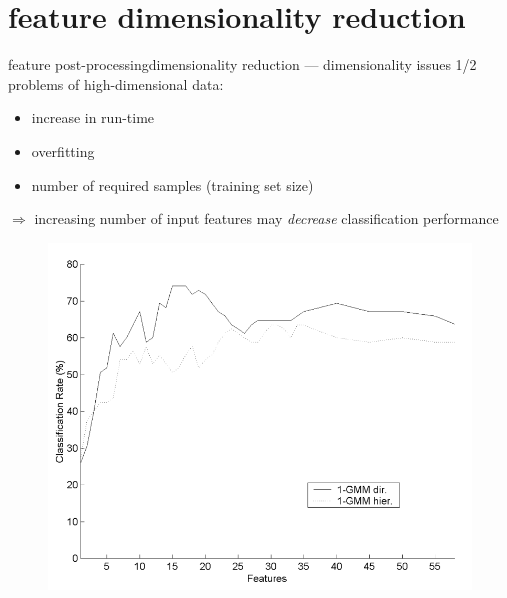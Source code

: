     \section[reduction]{feature dimensionality reduction}
		\begin{frame}{feature post-processing}{dimensionality reduction --- dimensionality issues 1/2}
            problems of high-dimensional data:
            \begin{itemize}
                \item   increase in run-time
                \item   overfitting
                \item   number of required samples (training set size)
            \end{itemize}
            \pause
			$\Rightarrow$ increasing number of input features may \textit{decrease} classification performance
			
			\begin{figure}
				\centering
				\hspace{-5mm}\vspace{-5mm}
				\includegraphics[scale=.2]{graph/curseofdimensionality}
			\end{figure}
		\end{frame}
